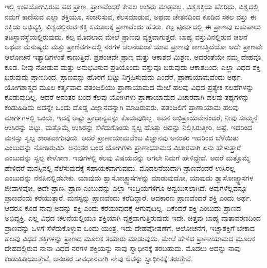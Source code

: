 ಇಲ್ಲಿ ಉಪಯೋಗಿಸಿರುವ ಪದ ಪ್ರಾಣ. ಪ್ರಾಣವೆಂದರೆ ಕೇವಲ ಉಸಿರು ಮಾತ್ರವಲ್ಲ. ವಿಶ್ವಶಕ್ತಿಯ ಹೆಸರಿದು. ವಿಶ್ವದಲ್ಲಿ ನಮಗೆ ಕಾಣಿಸುವ ಎಲ್ಲಾ ಶಕ್ತಿಯೂ, ಸಂಚರಿಸುವ, ಕೆಲಸಮಾಡುವ, ಅಥವಾ ಚೇತನದಿಂದ ಕೂಡಿದ ಸಕಲ ವಸ್ತು ಈ ಶಕ್ತಿಯ ಅಭಿವ್ಯಕ್ತಿ. ವಿಶ್ವದಲ್ಲಿರುವ ಶಕ್ತಿ ಸಮೂಲಕ್ಕೆ ಪ್ರಾಣವೆಂದು ಹೆಸರು. ಕಲ್ಪ ಪೂರ್ವದಲ್ಲಿ ಈ ಪ್ರಾಣವು ಬಹುಪಾಲು ತಟಸ್ಥಾವಸ್ಥೆಯಲ್ಲಿರುವುದು. ಕಲ್ಪ ಮೊದಲಾದ ಮೇಲೆ ಪ್ರಾಣವು ವ್ಯಕ್ತವಾಗುತ್ತದೆ. ಬಾಹ್ಯ ವಸ್ತುವಿನಲ್ಲಿರುವ ಚಲನೆ ಅಥವಾ ಮನುಷ್ಯರು ಮತ್ತು ಪ್ರಾಣಿವರ್ಗದಲ್ಲಿ ನರಗಳ ಚಲನೆಯಂತೆ ಯಾವ ಪ್ರಾಣವು ಕಾಣುತ್ತಿದೆಯೋ ಅದೇ ಪ್ರಾಣವೇ ಆಲೋಚನೆ ಇತ್ಯಾದಿಗಳಂತೆ ಕಾಣುತ್ತಿದೆ. ಪ್ರಪಂಚವೇ ಪ್ರಾಣ ಮತ್ತು ಆಕಾಶದ ಮಿಶ್ರಣ. ಅದರಂತೆಯೇ ನಮ್ಮ ದೇಹವೂ ಕೂಡ. ನೀವು ನೋಡುವ ಮತ್ತು ಅನುಭವಿಸುವ ಪ್ರತಿಯೊಂದು ವಸ್ತುವೂ ಬರುವುದು ಆಕಾಶದಿಂದ; ಎಲ್ಲಾ ವಿಧದ ಶಕ್ತಿ ಬರುವುದು ಪ್ರಾಣದಿಂದ. ಪ್ರಾಣವನ್ನು ಹೊರಗೆ ಬಿಟ್ಟು ನಿಗ್ರಹಿಸುವುದು ಎಂದರೆ, ಪ್ರಾಣಾಯಾಮವೆಂದು ಅರ್ಥ. ಯೋಗಶಾಸ್ತ್ರದ ಮೂಲ ಕರ್ತೃವಾದ ಪತಂಜಲಿಯು ಪ್ರಾಣಾಯಾಮದ ಮೇಲೆ ಹಲವು ವಿಧದ ಪ್ರತ್ಯೇಕ ಸಲಹೆಗಳನ್ನು ಕೊಡುವುದಿಲ್ಲ. ಆದರೆ ಅನಂತರ ಬಂದ ಕೆಲವು ಯೋಗಿಗಳು ಪ್ರಾಣಾಯಾಮದ ವಿಚಾರವಾಗಿ ಹಲವು ತಥ್ಯಗಳನ್ನು ಕಂಡುಹಿಡಿದು ಅದನ್ನೇ ಒಂದು ದೊಡ್ಡ ವಿಜ್ಞಾನವನ್ನಾಗಿ ಮಾಡಿರುವರು. ಪತಂಜಲಿಗೆ ಪ್ರಾಣಾಯಾಮ ಹಲವು ಮಾರ್ಗಗಳಲ್ಲಿ ಒಂದು, ಇದಕ್ಕೆ ಅಷ್ಟು ಪ್ರಾಧಾನ್ಯವನ್ನು ಕೊಡುವುದಿಲ್ಲ. ಅವನ ಅಭಿಪ್ರಾಯವೇನೆಂದರೆ, ನೀವು ಸುಮ್ಮನೆ ಉಸಿರನ್ನು ಬಿಟ್ಟು, ಮತ್ತೊಮ್ಮೆ ಉಸಿರನ್ನು ಸೆಳೆದುಕೊಂಡು ಸ್ವಲ್ಪ ಹೊತ್ತು ಅದನ್ನು ನಿಲ್ಲಿಸಿರುತ್ತೀರಿ, ಅಷ್ಟೆ. ಇದರಿಂದ ಮನಸ್ಸು ಸ್ವಲ್ಪ ಶಾಂತವಾಗುವುದು. ಆದರೆ ಪ್ರಾಣಾಯಾಮವೆಂಬ ವಿಜ್ಞಾನವು ಅನಂತರ ಇದರಿಂದ ಬೆಳೆಯಿತು ಎಂಬುದನ್ನು ನೋಡಿರುವಿರಿ. ಅನಂತರ ಬಂದ ಯೋಗಿಗಳು ಪ್ರಾಣಾಯಾಮದ ವಿಚಾರವಾಗಿ ಏನು ಹೇಳುತ್ತಾರೆ ಎಂಬುದನ್ನು ಸ್ವಲ್ಪ ಕೇಳೋಣ. ಇವುಗಳಲ್ಲಿ ಕೆಲವು ವಿಷಯವನ್ನು ಆಗಲೇ ನಿಮಗೆ ಹೇಳಿದ್ದೇವೆ. ಆದರೆ ಮತ್ತೊಮ್ಮೆ ಹೇಳಿದರೆ ಮನಸ್ಸಿನಲ್ಲಿ ನೆಲೆಸುವುದಕ್ಕೆ ಸಹಾಯಕವಾಗುವುದು. ಮೊದಲನೆಯದಾಗಿ ಪ್ರಾಣವೆಂದರೆ ಉಸಿರಲ್ಲ ಎಂಬುದನ್ನು ನೆನಪಿನಲ್ಲಿಡಬೇಕು. ಯಾವುದು ಶ್ವಾಸೋಚ್ಛ್ವಾಸಗಳನ್ನು ಮಾಡುವುದೋ, ಯಾವುದು ಶ್ವಾಸೋಚ್ಛ್ವಾಸಗಳ ಜೀವಾಳವೋ, ಅದೇ ಪ್ರಾಣ. ಪ್ರಾಣ ಎಂಬುದನ್ನು ಎಲ್ಲಾ ಇಂದ್ರಿಯಗಳಿಗೂ ಅನ್ವಯಿಸಲಾಗಿದೆ. ಅವುಗಳೆಲ್ಲವನ್ನೂ ಪ್ರಾಣವೆಂದು ಕರೆಯುತ್ತಾರೆ. ಮನಸ್ಸನ್ನು ಪ್ರಾಣವೆಂದು ಕರೆದಿದ್ದಾರೆ. ಆದಕಾರಣ ಪ್ರಾಣವೆಂದರೆ ಶಕ್ತಿ ಎಂದು ಅರ್ಥ. ಆದರೂ ಕೂಡ ನಾವು ಅದನ್ನು ಶಕ್ತಿ ಎಂದು ಕರೆಯುವುದಕ್ಕೆ ಆಗುವುದಿಲ್ಲ. ಏಕೆಂದರೆ ಶಕ್ತಿ ಎಂಬುದು ಪ್ರಾಣದ ಅಭಿವ್ಯಕ್ತಿ. ಎಲ್ಲ ವಿಧದ ಚಲನೆಯಲ್ಲಿಯೂ ಶಕ್ತಿಯಾಗಿ ವ್ಯಕ್ತವಾಗುತ್ತಿರುವುದು ಇದೇ. ಚಿತ್ತವು ಬಾಹ್ಯ ವಾತಾವರಣದಿಂದ ಪ್ರಾಣವನ್ನು ಒಳಗೆ ಸೆಳೆದುಕೊಳ್ಳುವ ಒಂದು ಯಂತ್ರ. ಇದು ದೇಹಪೋಷಣೆಗೆ, ಆಲೋಚನೆಗೆ, ಇಚ್ಛಾಶಕ್ತಿಗೆ ಬೇಕಾದ ಹಲವು ವಿಧದ ಶಕ್ತಿಗಳನ್ನು ಪ್ರಾಣದ ಮೂಲಕ ತಯಾರು ಮಾಡುವುದು. ಮೇಲೆ ಹೇಳಿದ ಪ್ರಾಣಾಯಾಮದ ಮೂಲಕ ದೇಹದಲ್ಲಿರುವ ನಾನಾ ವಿಧದ ನರಗಳ ಶಕ್ತಿಯನ್ನು ನಾವು ಸ್ವಾಧೀನಕ್ಕೆ ತರಬಹುದು. ಮೊದಲು ಅದನ್ನು ನಾವು ಕಂಡುಹಿಡಿಯುತ್ತೇವೆ, ಅನಂತರ ಸಾವಧಾನವಾಗಿ ನಾವು ಅವನ್ನು ಸ್ವಾಧೀನಕ್ಕೆ ತರುತ್ತೇವೆ. 

